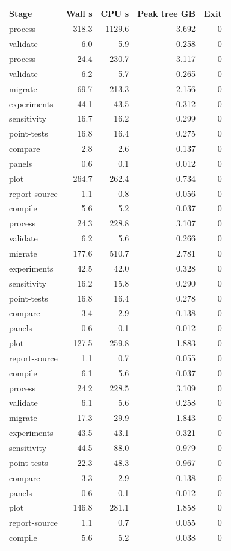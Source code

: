 \documentclass[11pt]{article}
\begin{document}
\begin{longtable}{lrrrr}\toprule
Stage & Wall s & CPU s & Peak tree GB & Exit\\\midrule\endhead
process & 318.3 & 1129.6 & 3.692 & 0 \\
validate & 6.0 & 5.9 & 0.258 & 0 \\
process & 24.4 & 230.7 & 3.117 & 0 \\
validate & 6.2 & 5.7 & 0.265 & 0 \\
migrate & 69.7 & 213.3 & 2.156 & 0 \\
experiments & 44.1 & 43.5 & 0.312 & 0 \\
sensitivity & 16.7 & 16.2 & 0.299 & 0 \\
point-tests & 16.8 & 16.4 & 0.275 & 0 \\
compare & 2.8 & 2.6 & 0.137 & 0 \\
panels & 0.6 & 0.1 & 0.012 & 0 \\
plot & 264.7 & 262.4 & 0.734 & 0 \\
report-source & 1.1 & 0.8 & 0.056 & 0 \\
compile & 5.6 & 5.2 & 0.037 & 0 \\
process & 24.3 & 228.8 & 3.107 & 0 \\
validate & 6.2 & 5.6 & 0.266 & 0 \\
migrate & 177.6 & 510.7 & 2.781 & 0 \\
experiments & 42.5 & 42.0 & 0.328 & 0 \\
sensitivity & 16.2 & 15.8 & 0.290 & 0 \\
point-tests & 16.8 & 16.4 & 0.278 & 0 \\
compare & 3.4 & 2.9 & 0.138 & 0 \\
panels & 0.6 & 0.1 & 0.012 & 0 \\
plot & 127.5 & 259.8 & 1.883 & 0 \\
report-source & 1.1 & 0.7 & 0.055 & 0 \\
compile & 6.1 & 5.6 & 0.037 & 0 \\
process & 24.2 & 228.5 & 3.109 & 0 \\
validate & 6.1 & 5.6 & 0.258 & 0 \\
migrate & 17.3 & 29.9 & 1.843 & 0 \\
experiments & 43.5 & 43.1 & 0.321 & 0 \\
sensitivity & 44.5 & 88.0 & 0.979 & 0 \\
point-tests & 22.3 & 48.3 & 0.967 & 0 \\
compare & 3.3 & 2.9 & 0.138 & 0 \\
panels & 0.6 & 0.1 & 0.012 & 0 \\
plot & 146.8 & 281.1 & 1.858 & 0 \\
report-source & 1.1 & 0.7 & 0.055 & 0 \\
compile & 5.6 & 5.2 & 0.038 & 0 \\
\bottomrule\end{longtable}
\end{document}
